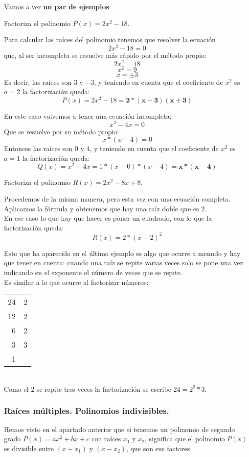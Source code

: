 \documentclass[a4paper,11pt,answers]{exam}
\begin{document}
Vamos a ver \textbf{un par de ejemplos}:
\begin{questions}
\question Factoriza el polinomio $P(x) = 2x^2 - 18$.
  \begin{solution}
    Para calcular las raíces del polinomio tenemos que resolver la ecuación
    \[2x^2 - 18 = 0\]
    que, al ser incompleta se resuelve más rápido por el método propio:
    \[2x^2 = 18\]
    \[x^2 = 9\]
    \[x = \pm 3\]
    Es decir, las raíces son $3$ y $-3$, y teniendo en cuenta que el coeficiente de $x^2$ es $a= 2$ la factorización queda:
    \[P(x) = 2x^2 - 18 = \boldsymbol{2*(x-3)(x+3)}\]
  \end{solution}
  \begin{solution}
    En este caso volvemos a tener una ecuación incompleta:
    \[x^2 - 4x = 0\]
    Que se resuelve por su método propio:
    \[x*(x-4) = 0\]
    Entonces las raíces son $0$ y $4$, y teniendo en cuenta que el coeficiente de $x^2$ es $a=1$ la factorización queda:
    \[Q(x) = x^2 - 4x = 1*(x-0)*(x-4) = \boldsymbol{x*(x-4)}\]
  \end{solution}
\question Factoriza el polinomio $R(x) = 2x^2 - 8x + 8$.
  \begin{solution}
    Procedemos de la misma manera, pero esta vez con una ecuación completa. Aplicamos la fórmula y obtenemos que hay una raíz doble que es $2$.\\
    En ese caso lo que hay que hacer es poner un cuadrado, con lo que la factorización queda:
    \[R(x) = 2*(x-2)^2\]
  \end{solution}
\end{questions}
Esto que ha aparecido en el último ejemplo es algo que ocurre a menudo
y hay que tener en cuenta: cuando una raíz se repite varias veces solo se pone una vez indicando en el exponente el número de veces que se repite.\\
Es similar a lo que ocurre al factorizar números:
\begin{tabular}{r|r}
24&2\\12&2\\6&2\\3&3\\1&
\end{tabular}\vspace{2mm}\\
Como el $2$ se repite tres veces la factorización se escribe $24=2^3*3$.

\subsubsection{Raíces múltiples. Polinomios indivisibles.}
Hemos visto en el apartado anterior que si tenemos un polinomio de segundo grado $P(x) = ax^2 + bx + c$ con raíces $x_1$ y $x_2$, significa que el polinomio $P(x)$ es divisible entre $(x-x_1)$ y $(x-x_2)$, que son sus factores.\\
\end{document}
